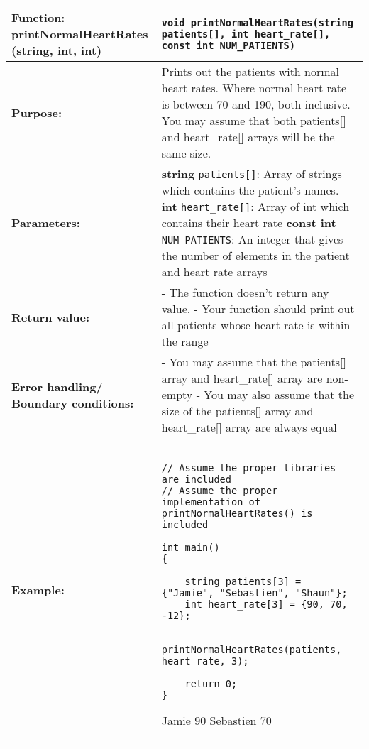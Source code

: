 \begin{longtable}[H]{|p{1.7in}|p{4.0in}|} \hline
        \textbf{Function:} \newline 
        printNormalHeartRates (string, int, int) & \texttt{void printNormalHeartRates(string patients[], int heart_rate[], const int NUM_PATIENTS)}
        \\ \hline
        \textbf{Purpose:}  & Prints out the patients with normal heart rates. Where normal heart rate is between 70 and 190, both inclusive. You may assume that both patients[] and heart\_rate[] arrays will be the same size. \\ \hline
        \textbf{Parameters:} &  
        \textbf{string} \texttt{patients[]}: Array of strings which contains the patient's names. \newline
        \textbf{int} \texttt{heart\_rate[]}: Array of int which contains their heart rate \newline
        \textbf{const int} \texttt{NUM\_PATIENTS}: An integer that gives the number of elements in the patient and heart rate arrays
\\ \hline
        \textbf{Return value:} &  
        - The function doesn't return any value.\newline 
        - Your function should print out all patients whose heart rate is within the range\\ \hline
         \textbf{Error handling/ Boundary conditions:} &  
         - You may assume that the patients[] array and heart\_rate[] array are non-empty\newline 
        - You may also assume that the size of the patients[] array and heart\_rate[] array are always equal\\ \hline
        \textbf{Example:} & 
        \begin{example}
        \begin{verbatim}

// Assume the proper libraries are included
// Assume the proper implementation of printNormalHeartRates() is included

int main() 
{
    
    string patients[3] = {"Jamie", "Sebastien", "Shaun"};
    int heart_rate[3] = {90, 70, -12};
    
    printNormalHeartRates(patients, heart_rate, 3);
        
    return 0;
}
        \end{verbatim}
        \end{example}

        \begin{sample}

Jamie 90 \newline
Sebastien 70 \newline
        \end{sample}
             \\ \hline
\end{longtable}

